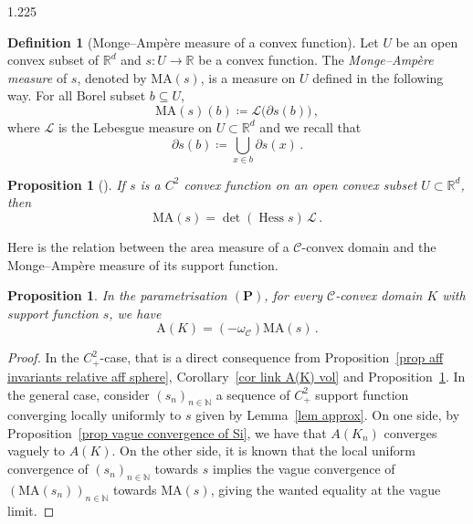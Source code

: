 \documentclass[reqno, a4paper]{amsart}
\numberwithin{equation}{section}
\numberwithin{figure}{section}
\newtheorem{proposition}[theorem]{Proposition}
\theoremstyle{definition}
\newtheorem{definition}[theorem]{Definition}
\theoremstyle{remark}
\newcommand{\R}{\mathbb{R}} %
\newcommand{\N}{\mathbb{N}} %
\DeclareMathOperator{\Hess}{Hess} %
\newcommand{\C}{\mathcal{C}} %
\newcommand{\Area}{\mathrm{A}} %
\newcommand{\MA}{\mathrm{MA}} %
\newcommand{\bp}[1]{{\bigl( {#1} \bigr)}} %
\begin{document}
\begin{spacing}{1.225}
\begin{definition}[Monge--Amp\`ere measure of a convex function]
Let $U$ be an open convex subset of $\R^d$ and $s : U \to \R$ be a convex function. The \emph{Monge--Amp\`ere measure} of $s$, denoted by $\MA(s)$, is a measure on $U$ defined in the following way. For all Borel subset $b \subseteq U$,
\begin{equation*}
\MA(s)(b) \coloneqq \mathcal{L}\bp{\partial s(b)} \, ,
\end{equation*}
where $\mathcal{L}$ is the Lebesgue measure on $U\subset \R^{d}$ and we recall that
\begin{equation*}
\partial s(b) \coloneqq \bigcup_{x \in b}\partial s(x) \, . 
\end{equation*}
\end{definition}

\begin{proposition}[{\cite[Theorem~A.31]{Figalli_17}}]
\label{prop MA=det Hess}
If $s$ is a $C^2$ convex function on an open convex subset $U \subset \R^d$, then 
\begin{equation*}
\MA(s) = \det( \Hess s ) \, \mathcal{L} \, . 
\end{equation*}
\end{proposition}

Here is the relation between the area measure of a $\C$-convex domain and the Monge--Amp\`ere measure of its support function. 

\begin{proposition}
\label{prop A MA C-convex}
In the parametrisation $(\mathbf{P})$, for every $\C$-convex domain $K$ with support function $s$, we have 
\begin{equation*}
\Area(K) = (-\omega_\C) \MA(s) \, . 
\end{equation*}
\end{proposition}
\begin{proof}
In the $C^2_+$-case, that is a direct consequence from Proposition~\ref{prop aff invariants relative aff sphere}, Corollary~\ref{cor link A(K) vol} and Proposition~\ref{prop MA=det Hess}. In the general case, consider $(s_n)_{n\in\N}$ a sequence of $C^2_+$ support function converging locally uniformly to $s$ given by Lemma~\ref{lem approx}. On one side, by Proposition~\ref{prop vague convergence of Si}, we have that $A(K_n)$ converges vaguely to $A(K)$. On the other side, it is known \cite[Proposition~2.6]{Figalli_17} that the local uniform convergence of $(s_n)_{n\in \N}$ towards $s$ implies the vague convergence of $(\MA(s_n))_{n\in\N}$ towards $\MA(s)$, giving the wanted equality at the vague limit. 
\end{proof}



\end{spacing}
\end{document}

